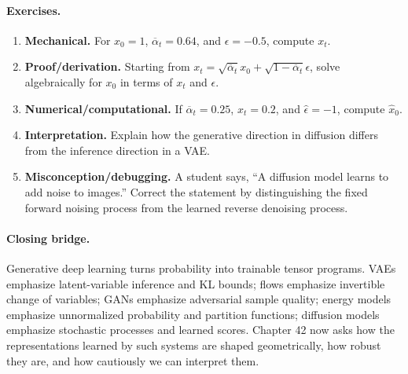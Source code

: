 \paragraph{Exercises.}
\begin{enumerate}[label=\textbf{41.4.\arabic*.}, leftmargin=*]
\item \textbf{Mechanical.} For \(x_0=1\), \(\overline\alpha_t=0.64\), and \(\epsilon=-0.5\), compute \(x_t\).
\item \textbf{Proof/derivation.} Starting from \(x_t=\sqrt{\overline\alpha_t}x_0+\sqrt{1-\overline\alpha_t}\epsilon\), solve algebraically for \(x_0\) in terms of \(x_t\) and \(\epsilon\).
\item \textbf{Numerical/computational.} If \(\overline\alpha_t=0.25\), \(x_t=0.2\), and \(\widehat\epsilon=-1\), compute \(\widehat x_0\).
\item \textbf{Interpretation.} Explain how the generative direction in diffusion differs from the inference direction in a VAE.
\item \textbf{Misconception/debugging.} A student says, ``A diffusion model learns to add noise to images.'' Correct the statement by distinguishing the fixed forward noising process from the learned reverse denoising process.
\end{enumerate}

\paragraph{Closing bridge.}
Generative deep learning turns probability into trainable tensor programs. VAEs emphasize latent-variable inference and KL bounds; flows emphasize invertible change of variables; GANs emphasize adversarial sample quality; energy models emphasize unnormalized probability and partition functions; diffusion models emphasize stochastic processes and learned scores. Chapter 42 now asks how the representations learned by such systems are shaped geometrically, how robust they are, and how cautiously we can interpret them.

\clearpage
